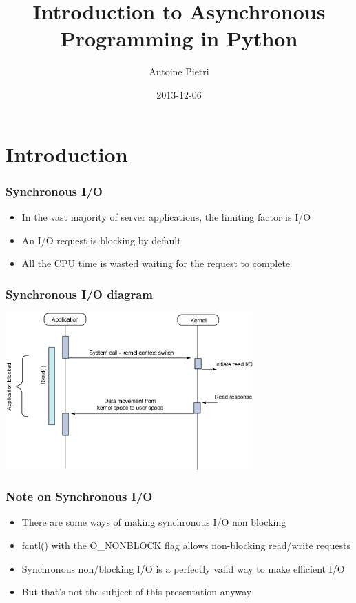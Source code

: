 \documentclass[ignorenonframetext,]{beamer}
\title{Introduction to Asynchronous Programming in Python}
\author{Antoine Pietri}
\date{2013-12-06}
\begin{document}
\frame{\titlepage}

\section{Introduction}

\begin{frame}[fragile]\frametitle{Synchronous I/O}

\begin{itemize}[<+->]
\itemsep1pt\parskip0pt
\item
  In the vast majority of server applications, the limiting factor is
  I/O
\item
  An I/O request is blocking by default
\item
  All the CPU time is wasted waiting for the request to complete
\end{itemize}

\end{frame}

\begin{frame}\frametitle{Synchronous I/O diagram}

\begin{center}
 \includegraphics[height=6cm]{img/synchronous.png}
\end{center}

\end{frame}

\begin{frame}[fragile]\frametitle{Note on Synchronous I/O}

\begin{itemize}[<+->]
\itemsep1pt\parskip0pt
\item
  There are some ways of making synchronous I/O non blocking
\item
  fcntl() with the O\_NONBLOCK flag allows non-blocking read/write
  requests
\item
  Synchronous non/blocking I/O is a perfectly valid way to make
  efficient I/O
\item
  But that's not the subject of this presentation anyway
\end{itemize}

\end{frame}
\end{document}
